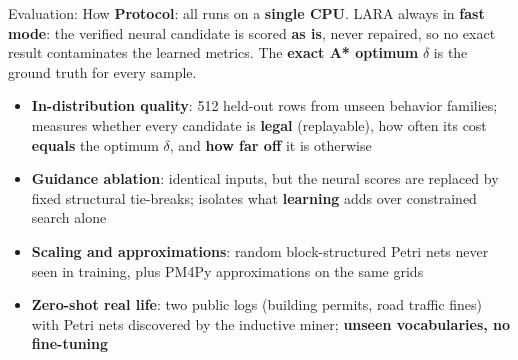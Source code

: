 \documentclass[aspectratio=169]{beamer}
\newcommand{\keyc}[1]{\textbf{\textcolor{larablue}{#1}}}
\newcommand{\keyg}[1]{\textbf{\textcolor{laraaqua!70!black}{#1}}}
\newcommand{\keya}[1]{\textbf{\textcolor{laraamber!85!black}{#1}}}
\begin{document}
\begin{frame}{Evaluation: How}
  \small
  \textbf{Protocol}: all runs on a \keyc{single CPU}. LARA always in
  \keyc{fast mode}: the verified neural candidate is scored \keya{as is},
  never repaired, so no exact result contaminates the learned metrics.
  The \keyg{exact A* optimum} $\delta$ is the ground truth for every sample.
  \vspace{2mm}
  \begin{itemize}\setlength{\itemsep}{6pt}
    \item \keyc{In-distribution quality}: 512 held-out rows from unseen
      behavior families; measures whether every candidate is
      \keyg{legal} (replayable), how often its cost \keyg{equals} the
      optimum $\delta$, and \keyg{how far off} it is otherwise
    \item \keyc{Guidance ablation}: identical inputs, but the neural scores are
      replaced by fixed structural tie-breaks; isolates what \keyg{learning}
      adds over constrained search alone
    \item \keyc{Scaling and approximations}: random block-structured Petri nets
      never seen in training, plus PM4Py approximations on the same grids
    \item \keyc{Zero-shot real life}: two public logs (building permits,
      road traffic fines) with Petri nets discovered by the inductive miner;
      \keya{unseen vocabularies, no fine-tuning}
  \end{itemize}
\end{frame}
\end{document}

